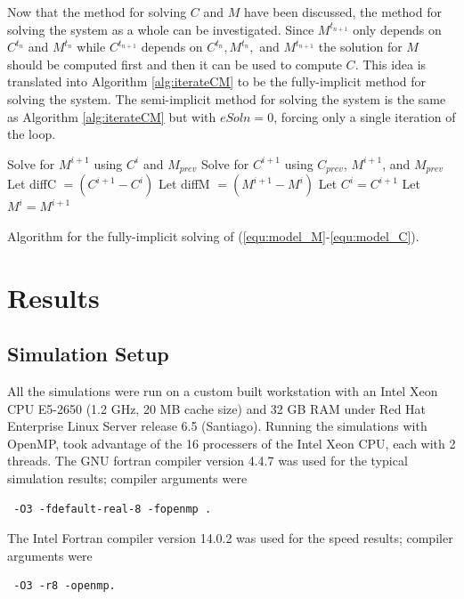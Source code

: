 \documentclass{llncs}
\begin{document}
  Now that the method for solving $C$ and $M$ have been discussed, the method for solving the system as a whole can be investigated. 
  Since $M^{t_{n+1}}$ only depends on $C^{t_n}$ and $M^{t_n}$ while $C^{t_{n+1}}$ depends on $C^{t_n}, M^{t_n},$ and $M^{t_{n+1}}$ the solution for $M$ should be computed first and then it can be used to compute $C$. 
  This idea is translated into Algorithm \ref{alg:iterateCM} to be the fully-implicit method for solving the system.
  The semi-implicit method for solving the system is the same as Algorithm \ref{alg:iterateCM} but with $eSoln = 0$, forcing only a single iteration of the loop.

  \begin{algorithm}[h!tb]
    \Begin
    {
      {
          Solve for $M^{i+1}$ using $C^{i}$ and $M_{prev}$\;
          Solve for $C^{i+1}$ using $C_{prev}$, $M^{i+1}$, and $M_{prev}$\;
          Let diffC $=  (C^{i+1} - C^i)$\;
          Let diffM $= (M^{i+1} - M^i)$\;
          Let $C^{i} = C^{i+1}$
          Let $M^{i} = M^{i+1}$\;
      }
    }
    \caption{Algorithm for the fully-implicit solving of (\ref{equ:model_M}-\ref{equ:model_C}).}
    \label{alg:iterateCM}
  \end{algorithm}



\section{Results}
  \subsection{Simulation Setup}
    All the simulations were run on a custom built workstation with an Intel Xeon CPU E5-2650 (1.2 GHz, 20 MB cache size) and 32 GB RAM under Red Hat Enterprise Linux Server release 6.5 (Santiago). 
    Running the simulations with OpenMP, took advantage of the 16 processers of the Intel Xeon CPU, each with 2 threads. 
    The GNU fortran compiler version 4.4.7 was used for the typical simulation results; compiler arguments were \begin{verbatim} -O3 -fdefault-real-8 -fopenmp .\end{verbatim}
    The Intel Fortran compiler version 14.0.2 was used for the speed results; compiler arguments were \begin{verbatim} -O3 -r8 -openmp. \end{verbatim}
\end{document}
